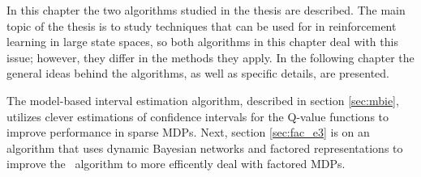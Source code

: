 In this chapter the two algorithms studied in the thesis are described. The main topic of the thesis is to study techniques that can be used for in reinforcement learning in large state spaces, so both algorithms in this chapter deal with this issue; however, they differ in the methods they apply. In the following chapter the general ideas behind the algorithms, as well as specific details, are presented. 

The model-based interval estimation algorithm, described in section \ref{sec:mbie}, utilizes clever estimations of confidence intervals for the Q-value functions to improve performance in sparse MDPs. Next, section \ref{sec:fac_e3} is on an algorithm that uses dynamic Bayesian networks and factored representations to improve the \etre\ algorithm to more efficently deal with factored MDPs. 
